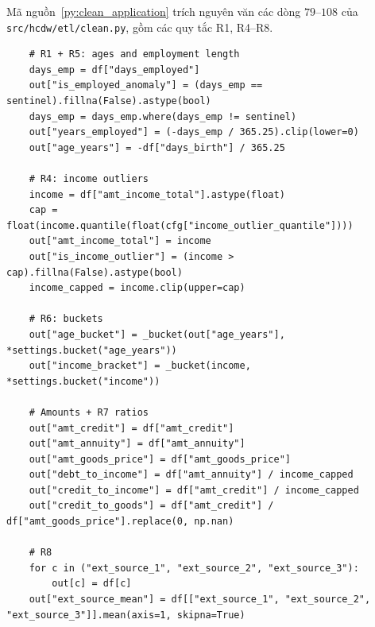 Mã nguồn~\ref{py:clean_application} trích nguyên văn các dòng $79$--$108$ của \texttt{src/hcdw/etl/clean.py}, gồm các quy tắc R1, R4--R8.

\begin{listing}[H]
	\footnotesize
	\begin{verbatim}
    # R1 + R5: ages and employment length
    days_emp = df["days_employed"]
    out["is_employed_anomaly"] = (days_emp == sentinel).fillna(False).astype(bool)
    days_emp = days_emp.where(days_emp != sentinel)
    out["years_employed"] = (-days_emp / 365.25).clip(lower=0)
    out["age_years"] = -df["days_birth"] / 365.25

    # R4: income outliers
    income = df["amt_income_total"].astype(float)
    cap = float(income.quantile(float(cfg["income_outlier_quantile"])))
    out["amt_income_total"] = income
    out["is_income_outlier"] = (income > cap).fillna(False).astype(bool)
    income_capped = income.clip(upper=cap)

    # R6: buckets
    out["age_bucket"] = _bucket(out["age_years"], *settings.bucket("age_years"))
    out["income_bracket"] = _bucket(income, *settings.bucket("income"))

    # Amounts + R7 ratios
    out["amt_credit"] = df["amt_credit"]
    out["amt_annuity"] = df["amt_annuity"]
    out["amt_goods_price"] = df["amt_goods_price"]
    out["debt_to_income"] = df["amt_annuity"] / income_capped
    out["credit_to_income"] = df["amt_credit"] / income_capped
    out["credit_to_goods"] = df["amt_credit"] / df["amt_goods_price"].replace(0, np.nan)

    # R8
    for c in ("ext_source_1", "ext_source_2", "ext_source_3"):
        out[c] = df[c]
    out["ext_source_mean"] = df[["ext_source_1", "ext_source_2", "ext_source_3"]].mean(axis=1, skipna=True)
\end{verbatim}
	\caption{Trích đoạn hàm \texttt{clean\_application}}
	\label{py:clean_application}
\end{listing}

